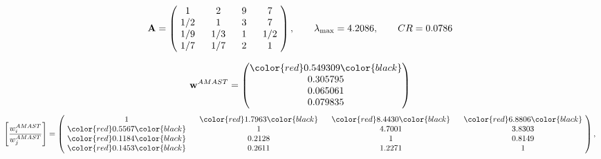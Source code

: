 \begin{example}
\begin{equation*}
\mathbf{A} =
\begin{pmatrix}
$\,\,$ 1 $\,\,$ & $\,\,$2$\,\,$ & $\,\,$9$\,\,$ & $\,\,$7 $\,\,$ \\
$\,\,$ 1/2$\,\,$ & $\,\,$ 1 $\,\,$ & $\,\,$3$\,\,$ & $\,\,$7 $\,\,$ \\
$\,\,$ 1/9$\,\,$ & $\,\,$ 1/3$\,\,$ & $\,\,$ 1 $\,\,$ & $\,\,$ 1/2 $\,\,$ \\
$\,\,$ 1/7$\,\,$ & $\,\,$ 1/7$\,\,$ & $\,\,$2$\,\,$ & $\,\,$ 1  $\,\,$ \\
\end{pmatrix},
\qquad
\lambda_{\max} =
4.2086,
\qquad
CR = 0.0786
\end{equation*}

\begin{equation*}
\mathbf{w}^{AMAST} =
\begin{pmatrix}
\color{red} 0.549309\color{black} \\
0.305795\\
0.065061\\
0.079835
\end{pmatrix}\end{equation*}
\begin{equation*}
\left[ \frac{{w}^{AMAST}_i}{{w}^{AMAST}_j} \right] =
\begin{pmatrix}
$\,\,$ 1 $\,\,$ & $\,\,$\color{red} 1.7963\color{black} $\,\,$ & $\,\,$\color{red} 8.4430\color{black} $\,\,$ & $\,\,$\color{red} 6.8806\color{black} $\,\,$ \\
$\,\,$\color{red} 0.5567\color{black} $\,\,$ & $\,\,$ 1 $\,\,$ & $\,\,$4.7001$\,\,$ & $\,\,$3.8303  $\,\,$ \\
$\,\,$\color{red} 0.1184\color{black} $\,\,$ & $\,\,$0.2128$\,\,$ & $\,\,$ 1 $\,\,$ & $\,\,$0.8149 $\,\,$ \\
$\,\,$\color{red} 0.1453\color{black} $\,\,$ & $\,\,$0.2611$\,\,$ & $\,\,$1.2271$\,\,$ & $\,\,$ 1  $\,\,$ \\
\end{pmatrix},
\end{equation*}


\end{example}
